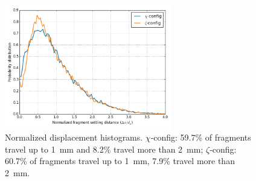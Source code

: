 \begin{figure}[!t]
    \centering
    \includegraphics[width = 0.65\textwidth]{figures/displacement_histograms.png}
    \caption{Normalized displacement histograms. $\chi$-config: 59.7\% of fragments travel up to \SI{1}{\milli\meter} and 8.2\% travel more than \SI{2}{\milli\meter}; $\zeta$-config: 60.7\% of fragments travel up to \SI{1}{\milli\meter}, 7.9\% travel more than \SI{2}{\milli\meter}.}\label{fig:displacement_hists}
\end{figure}

